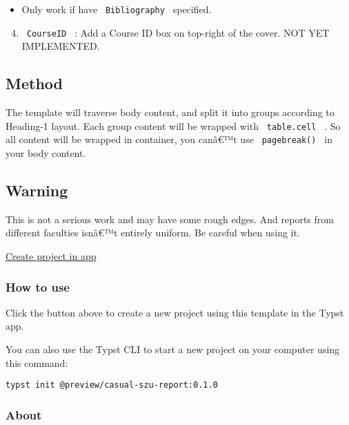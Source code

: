 \begin{itemize}
\tightlist
\item
  Only work if have \texttt{\ Bibliography\ } specified.
\end{itemize}

\begin{enumerate}
\setcounter{enumi}{3}
\tightlist
\item
  \texttt{\ CourseID\ } : Add a Course ID box on top-right of the cover.
  NOT YET IMPLEMENTED.
\end{enumerate}

\subsection{Method}\label{method}

The template will traverse body content, and split it into groups
according to Heading-1 layout. Each group content will be wrapped with
\texttt{\ table.cell\ } . So all content will be wrapped in container,
you canâ€™t use \texttt{\ pagebreak()\ } in your body content.

\subsection{Warning}\label{warning}

This is not a serious work and may have some rough edges. And reports
from different faculties isnâ€™t entirely uniform. Be careful when using
it.

\href{/app?template=casual-szu-report&version=0.1.0}{Create project in
app}

\subsubsection{How to use}\label{how-to-use}

Click the button above to create a new project using this template in
the Typst app.

You can also use the Typst CLI to start a new project on your computer
using this command:

\begin{verbatim}
typst init @preview/casual-szu-report:0.1.0
\end{verbatim}



\subsubsection{About}\label{about}

